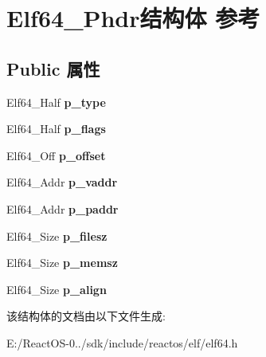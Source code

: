 \hypertarget{struct_elf64___phdr}{}\section{Elf64\+\_\+\+Phdr结构体 参考}
\label{struct_elf64___phdr}
\subsection*{Public 属性}
\begin{DoxyCompactItemize}
\item 
\mbox{\label{struct_elf64___phdr_a5b4cb44f1c556722954c44dad73406dc}} 
Elf64\+\_\+\+Half {\bfseries p\+\_\+type}
\item 
\mbox{\label{struct_elf64___phdr_a6aae92d5b7ce9d963a9e3135fb8e952c}} 
Elf64\+\_\+\+Half {\bfseries p\+\_\+flags}
\item 
\mbox{\label{struct_elf64___phdr_aa2d51fb4517ded0c74903f8d0c9abea7}} 
Elf64\+\_\+\+Off {\bfseries p\+\_\+offset}
\item 
\mbox{\label{struct_elf64___phdr_a5c69879e1229b175020ff011af46fcb9}} 
Elf64\+\_\+\+Addr {\bfseries p\+\_\+vaddr}
\item 
\mbox{\label{struct_elf64___phdr_a83f4adb032fc307f5af79bdee5ef692d}} 
Elf64\+\_\+\+Addr {\bfseries p\+\_\+paddr}
\item 
\mbox{\label{struct_elf64___phdr_af539be9f4e23d9b1f50f6d295ac27211}} 
Elf64\+\_\+\+Size {\bfseries p\+\_\+filesz}
\item 
\mbox{\label{struct_elf64___phdr_a33e222412e922c6b94503f42a854535b}} 
Elf64\+\_\+\+Size {\bfseries p\+\_\+memsz}
\item 
\mbox{\label{struct_elf64___phdr_a93dfc267d408bfada681a289c434c949}} 
Elf64\+\_\+\+Size {\bfseries p\+\_\+align}
\end{DoxyCompactItemize}


该结构体的文档由以下文件生成\+:\begin{DoxyCompactItemize}
\item 
E\+:/\+React\+O\+S-\/0../sdk/include/reactos/elf/elf64.\+h\end{DoxyCompactItemize}
